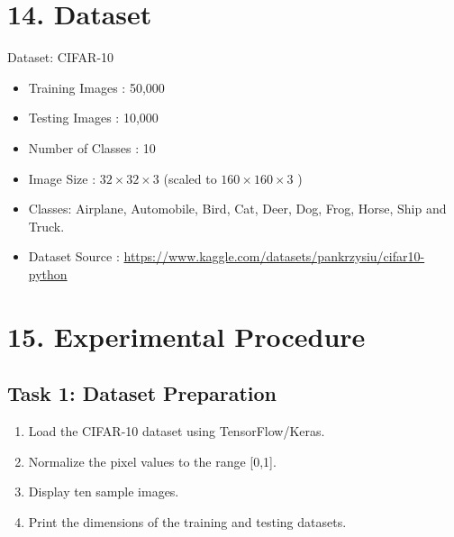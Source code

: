 \documentclass[11pt]{article}
\begin{document}

\section*{14. Dataset}

Dataset: CIFAR-10

\begin{itemize}

\item Training Images : 50,000

\item Testing Images : 10,000

\item Number of Classes : 10

\item Image Size : $32\times32\times3$ (scaled to $160\times160\times3$ )

\item Classes:
Airplane, Automobile, Bird, Cat, Deer,
Dog, Frog, Horse, Ship and Truck.

\item Dataset Source : \url{https://www.kaggle.com/datasets/pankrzysiu/cifar10-python}

\end{itemize}


\section*{15. Experimental Procedure}

\subsection*{Task 1: Dataset Preparation}

\begin{enumerate}

\item Load the CIFAR-10 dataset using TensorFlow/Keras.

\item Normalize the pixel values to the range [0,1].

\item Display ten sample images.

\item Print the dimensions of the training and testing datasets.

\end{enumerate}
\end{document}
